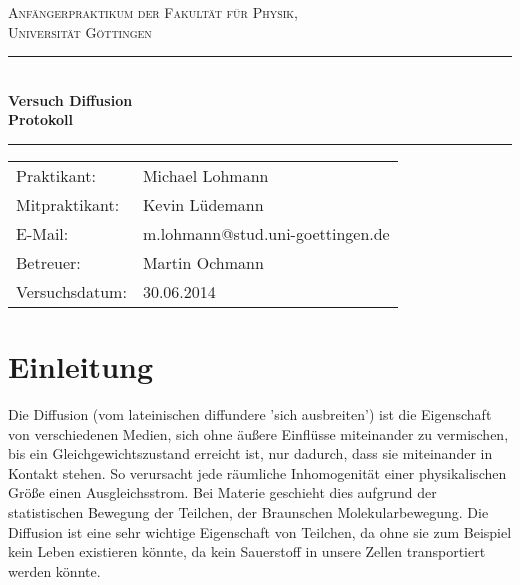 \documentclass[12pt,a4paper,titlepage,headinclude,bibtotoc]{scrartcl}
\begin{document}
\begin{titlepage}
\centering
\textsc{\Large Anfängerpraktikum der Fakultät für
  Physik,\\[1.5ex] Universität Göttingen}

\vspace*{4.2cm}

\rule{\textwidth}{1pt}\\[0.5cm]
{\huge \bfseries
  Versuch Diffusion\\[1.5ex]
  Protokoll}\\[0.5cm]
\rule{\textwidth}{1pt}

\vspace*{3cm}

\begin{Large}
\begin{tabular}{ll}
Praktikant: &  Michael Lohmann\\
Mitpraktikant: &  Kevin Lüdemann\\
E-Mail: & m.lohmann@stud.uni-goettingen.de\\
 Betreuer: & Martin Ochmann\\
 Versuchsdatum: & 30.06.2014\\
\end{tabular}
\end{Large}

\vspace*{0.8cm}

\begin{Large}
\end{Large}

\end{titlepage}

\tableofcontents

\newpage

\section{Einleitung}
\label{sec:einleitung}
Die Diffusion (vom lateinischen diffundere 'sich ausbreiten') ist die Eigenschaft von verschiedenen Medien, sich ohne äußere Einflüsse miteinander zu vermischen, bis ein Gleichgewichtszustand erreicht ist, nur dadurch, dass sie miteinander in Kontakt stehen.
So verursacht jede räumliche Inhomogenität einer physikalischen Größe einen Ausgleichsstrom.
Bei Materie geschieht dies aufgrund der statistischen Bewegung der Teilchen, der Braunschen Molekularbewegung.
Die Diffusion ist eine sehr wichtige Eigenschaft von Teilchen, da ohne sie zum Beispiel kein Leben existieren könnte, da kein Sauerstoff in unsere Zellen transportiert werden könnte.
\end{document}

